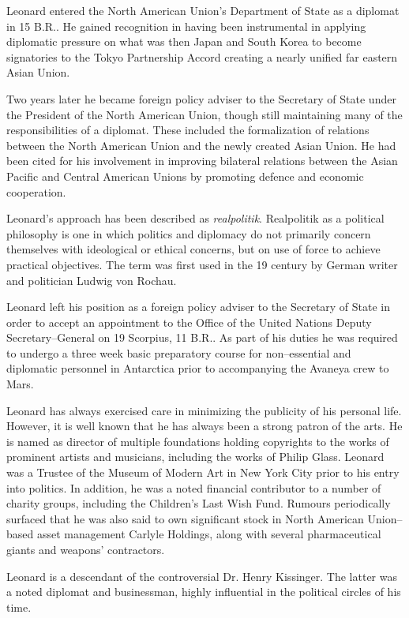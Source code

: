 Leonard entered the North American Union's Department of State as a diplomat in 15 B.R.. He gained recognition in having been instrumental in applying diplomatic pressure on what was then Japan and South Korea to become signatories to the Tokyo Partnership Accord creating a nearly unified far eastern Asian Union.

Two years later he became foreign policy adviser to the Secretary of State under the President of the North American Union, though still maintaining many of the responsibilities of a diplomat. These included the formalization of relations between the North American Union and the newly created Asian Union. He had been cited for his involvement in improving bilateral relations between the Asian Pacific and Central American Unions by promoting defence and economic cooperation.

Leonard's approach has been described as {\it realpolitik}. Realpolitik as a political philosophy is one in which politics and diplomacy do not primarily concern themselves with ideological or ethical concerns, but on use of force to achieve practical objectives. The term was first used in the 19 century by German writer and politician Ludwig von Rochau.

Leonard left his position as a foreign policy adviser to the Secretary of State in order to accept an appointment to the Office of the United Nations Deputy Secretary--General on 19 Scorpius, 11 B.R.. As part of his duties he was required to undergo a three week basic preparatory course for non--essential and diplomatic personnel in Antarctica prior to accompanying the Avaneya crew to Mars.

Leonard has always exercised care in minimizing the publicity of his personal life. However, it is well known that he has always been a strong patron of the arts. He is named as director of multiple foundations holding copyrights to the works of prominent artists and musicians, including the works of Philip Glass. Leonard was a Trustee of the Museum of Modern Art in New York City prior to his entry into politics. In addition, he was a noted financial contributor to a number of charity groups, including the Children's Last Wish Fund. Rumours periodically surfaced that he was also said to own significant stock in North American Union--based asset management Carlyle Holdings, along with several pharmaceutical giants and weapons' contractors.

Leonard is a descendant of the controversial Dr. Henry Kissinger. The latter was a noted diplomat and businessman, highly influential in the political circles of his time.

